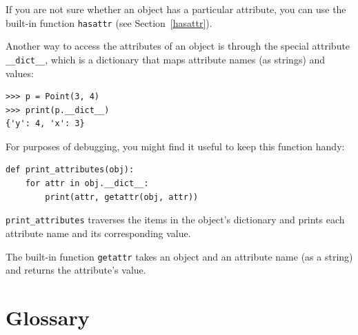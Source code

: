 \documentclass[10pt]{book}
\begin{document}

If you are not sure whether an object has a particular attribute, you
can use the built-in function {\tt hasattr} (see Section~\ref{hasattr}).


Another way to access the attributes of an object is through the
special attribute \verb"__dict__", which is a dictionary that maps
attribute names (as strings) and values:

\beforeverb
\begin{verbatim}
>>> p = Point(3, 4)
>>> print(p.__dict__)
{'y': 4, 'x': 3}
\end{verbatim}
\afterverb
%
For purposes of debugging, you might find it useful to keep this
function handy:

\beforeverb
\begin{verbatim}
def print_attributes(obj):
    for attr in obj.__dict__:
        print(attr, getattr(obj, attr))
\end{verbatim}
\afterverb
%
\verb"print_attributes" traverses the items in the object's dictionary
and prints each attribute name and its corresponding value.


The built-in function {\tt getattr} takes an object and an attribute
name (as a string) and returns the attribute's value.



\section{Glossary}
\end{document}
